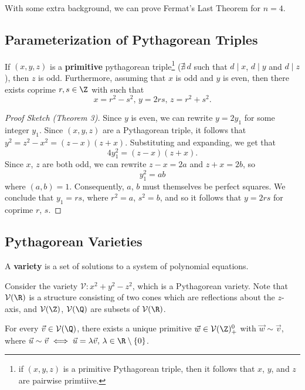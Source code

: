 \documentclass[11pt]{article}
\begin{document}
With some extra background, we can prove Fermat's Last Theorem for $n = 4$.

\subsection{Parameterization of Pythagorean Triples}

\begin{theorem}
If $(x, y, z)$ is a \textbf{primitive} pythagorean triple\footnote{if $(x, y, z)$ is a primitive Pythagorean triple, then it follows that $x$, $y$, and $z$ are pairwise primtiive.    
} ($\nexists \, d$ such that $d \mid x$, $d\mid y$ and $d \mid z$), then $z$ is odd. Furthermore, assuming that
$x$ is odd and $y$ is even, then there exists coprime $r, s \in \Z$ with such that
\[ x = r^2 - s^2, \, y = 2rs, \, z = r^2 + s^2. \]
\end{theorem}

\begin{proof}[Proof Sketch (Theorem 3)]
Since $y$ is even, we can rewrite $y = 2y_1$ for some integer $y_1$. Since $(x, y, z)$ are a Pythagorean triple, it follows that
\( y^2 = z^2 - x^2 = (z-x)(z+x). \) Substituting and expanding, we get that 
\[
    4y_1^2 = (z-x)(z+x).
\] 
Since $x$, $z$ are both odd, we can rewrite $z-x = 2a$ and $z+x =2b$, so 
\[ y_1^2 = ab\] where $(a, b) = 1$. Consequently, $a$, $b$ must themselves be perfect squares. We conclude that $y_1=rs$, where $r^2 = a$, $s^2=b$, and so it follows that
$y = 2rs$ for coprime $r$, $s$. 
\end{proof}

\subsection{Pythagorean Varieties}

\begin{definition}[Variety]
A \textbf{variety} is a set of solutions to a system of polynomial equations.
\end{definition}

Consider the variety $\mathcal{V}: x^2 + y^2 - z^2$, which is a Pythagorean variety. Note that
$\mathcal{V}(\R)$ is a structure consisting of two cones which are reflections about the $z$-axis,
and $ \mathcal{V}(\Z)$, $\mathcal{V}(\Q)$ are subsets of $\mathcal{V} (\R)$.

\begin{lemma}
For every $\vec{v} \in \mathcal{V}(\Q)$, there exists a unique primitive $\vec{w} \in \mathcal{V}(\Z)_+^{0}$ with $\vec{w} \sim \vec{v}$, where
$\vec{u} \sim \vec{v} \iff \vec{u} = \lambda\vec{v}, \, \lambda \in \R \setminus \{ 0\}$.
\end{lemma}
\end{document}
